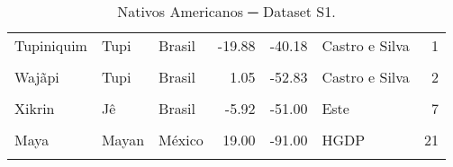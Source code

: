 \begin{table}[htb!]
\begin{tabular}[htb!]{lllrrlr}
Tupiniquim & Tupi & Brasil & -19.88 & -40.18 & Castro e Silva & 1\\
\cellcolor{gray!6}{Urubu\_Kaapor} & \cellcolor{gray!6}{Tupi} & \cellcolor{gray!6}{Brasil} & \cellcolor{gray!6}{-2.50} & \cellcolor{gray!6}{-46.50} & \cellcolor{gray!6}{Skoglund} & \cellcolor{gray!6}{3}\\
Wajãpi & Tupi & Brasil & 1.05 & -52.83 & Castro e Silva & 2\\
\cellcolor{gray!6}{Xavante} & \cellcolor{gray!6}{Jê} & \cellcolor{gray!6}{Brasil} & \cellcolor{gray!6}{-14.00} & \cellcolor{gray!6}{-52.50} & \cellcolor{gray!6}{Skoglund/Este} & \cellcolor{gray!6}{38}\\
Xikrin & Jê & Brasil & -5.92 & -51.00 & Este & 7\\
\cellcolor{gray!6}{Zoro} & \cellcolor{gray!6}{Tupi} & \cellcolor{gray!6}{Brasil} & \cellcolor{gray!6}{-10.33} & \cellcolor{gray!6}{-60.33} & \cellcolor{gray!6}{Skoglund} & \cellcolor{gray!6}{1}\\
Maya & Mayan & México & 19.00 & -91.00 & HGDP & 21\\
\cellcolor{gray!6}{Pima} & \cellcolor{gray!6}{Uto-Aztecan} & \cellcolor{gray!6}{México} & \cellcolor{gray!6}{29.00} & \cellcolor{gray!6}{-108.00} & \cellcolor{gray!6}{HGDP} & \cellcolor{gray!6}{14}\\
\bottomrule
\end{tabular}%
\caption{Nativos Americanos ─ Dataset S1.}
\label{tab:ds1_natives}

\end{table}
